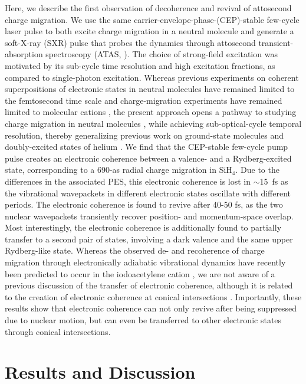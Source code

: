 \documentclass[12pt]{article}
\begin{document}
Here, we describe the first observation of decoherence and revival of attosecond charge migration. We use the same carrier-envelope-phase-(CEP)-stable few-cycle laser pulse to both excite charge migration in a neutral molecule and generate a soft-X-ray (SXR) pulse that probes the dynamics through attosecond transient-absorption spectroscopy (ATAS, \cite{goulielmakis10a,timmers19,kobayashi19a}). The choice of strong-field excitation was motivated by its sub-cycle time resolution and high excitation fractions, as compared to single-photon excitation. Whereas previous experiments on coherent superpositions of electronic states in neutral molecules have remained limited to the femtosecond time scale \cite{kraus13b,walt17a} and charge-migration experiments have remained limited to molecular cations \cite{kraus15b,calegari14a}, the present approach opens a pathway to studying charge migration in neutral molecules \cite{Dutoi2011}, while achieving sub-optical-cycle temporal resolution, thereby generalizing previous work on ground-state molecules \cite{neidel13a} and doubly-excited states of helium \cite{ott14a}. 
We find that the CEP-stable few-cycle pump pulse creates an electronic coherence between a valence- and a Rydberg-excited state, corresponding to a 690-as radial charge migration in SiH$_4$. Due to the differences in the associated PES, this electronic coherence is lost in $\sim$15~fs as the vibrational wavepackets in different electronic states oscillate with different periods. The electronic coherence is found to revive after 40-50 fs, as the two nuclear wavepackets transiently recover position- and momentum-space overlap. Most interestingly, the electronic coherence is additionally found to partially transfer to a second pair of states, involving a dark valence and the same upper Rydberg-like state. Whereas the observed de- and recoherence of charge migration through electronically adiabatic vibrational dynamics have recently been predicted to occur in the iodoacetylene cation \cite{jia19a}, we are not aware of a previous discussion of the transfer of electronic coherence, although it is related to the creation of electronic coherence at conical intersections \cite{kowalewski15a,keefer20a}. Importantly, these results show that electronic coherence can not only revive after being suppressed due to nuclear motion, but can even be transferred to other electronic states through conical intersections.

\section{Results and Discussion}
\end{document}
